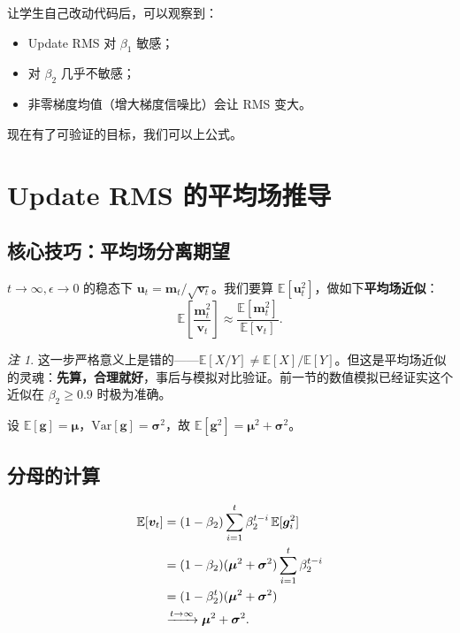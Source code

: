 \documentclass[11pt,a4paper]{ctexart}
\theoremstyle{definition}
\theoremstyle{remark}
\newtheorem{remark}[theorem]{注}
\newcommand{\E}{\mathbb{E}}
\newcommand{\Var}{\mathrm{Var}}
\begin{document}
让学生自己改动代码后，可以观察到：
\begin{itemize}
    \item Update RMS 对 $\beta_1$ 敏感；
    \item 对 $\beta_2$ 几乎不敏感；
    \item 非零梯度均值（增大梯度信噪比）会让 RMS 变大。
\end{itemize}
 
现在有了可验证的目标，我们可以上公式。
 
\section{Update RMS 的平均场推导}
 
\subsection{核心技巧：平均场分离期望}
 
$t\to\infty, \epsilon\to 0$ 的稳态下 $\bm{u}_t = \bm{m}_t/\sqrt{\bm{v}_t}$。我们要算 $\E[\bm{u}_t^2]$，做如下\textbf{平均场近似}：
\begin{equation}
\E\!\left[\frac{\bm{m}_t^2}{\bm{v}_t}\right] \approx \frac{\E[\bm{m}_t^2]}{\E[\bm{v}_t]}.
\label{eq:meanfield}
\end{equation}
 
\begin{remark}
这一步严格意义上是错的——$\E[X/Y] \ne \E[X]/\E[Y]$。但这是平均场近似的灵魂：\textbf{先算，合理就好}，事后与模拟对比验证。前一节的数值模拟已经证实这个近似在 $\beta_2 \geq 0.9$ 时极为准确。
\end{remark}
 
设 $\E[\bm{g}] = \bm{\mu}$，$\Var[\bm{g}] = \bm{\sigma}^2$，故 $\E[\bm{g}^2] = \bm{\mu}^2 + \bm{\sigma}^2$。
 
\subsection{分母的计算}
 
\begin{align}
\E[\bm{v}_t] 
&= (1-\beta_2) \sum_{i=1}^{t} \beta_2^{t-i}\, \E[\bm{g}_i^2] \notag \\
&= (1-\beta_2)(\bm{\mu}^2 + \bm{\sigma}^2) \sum_{i=1}^{t} \beta_2^{t-i} \notag \\
&= (1 - \beta_2^t)(\bm{\mu}^2 + \bm{\sigma}^2) \notag \\
&\xrightarrow{t \to \infty} \bm{\mu}^2 + \bm{\sigma}^2.
\label{eq:Ev}
\end{align}
 
\end{document}

